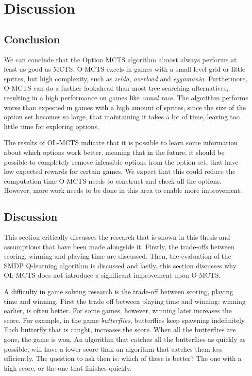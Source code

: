 \chapter{Discussion}
\label{sec:conclusion}



\section{Conclusion}
We can conclude that the Option MCTS algorithm almost always performs at least
as good as MCTS. O-MCTS excels in games with a small level grid or little
sprites, but high complexity, such as \textit{zelda}, \textit{overload} and
\textit{eggomania}.  Furthermore, O-MCTS can do a further lookahead than most
tree searching alternatives, resulting in a high performance on games like
\textit{camel race}. The algorithm performs worse than expected in games with a
high amount of sprites, since the size of the option set becomes so large, that
maintaining it takes a lot of time, leaving too little time for exploring
options. 

The results of OL-MCTS indicate that it is possible to learn some information
about which options work better, meaning that in the future, it should be
possible to completely remove infeasible options from the option set, that have
low expected rewards for certain games. We expect that this could reduce the
computation time O-MCTS needs to construct and check all the options. However,
more work needs to be done in this area to enable more improvement.

\section{Discussion}
This section critically discusses the research that is shown in this thesis and
assumptions that have been made alongside it. Firstly, the trade-offs between
scoring, winning and playing time are discussed. Then, the evaluation of the
SMDP Q-learning algorithm is discussed and lastly, this section discusses why
OL-MCTS does not introduce a significant improvement upon O-MCTS.

A difficulty in game solving research is the trade-off between scoring, playing
time and winning. First the trade off between playing time and winning: winning
earlier, is often better. For some games, however, winning later increases the
score. For example, in the game \textit{butterflies}, butterflies keep spawning
indefinitely. Each butterfly that is caught, increases the score.  When all the
butterflies are gone, the game is won. An algorithm that catches all the
butterflies as quickly as possible, will have a lower score than an algorithm
that catches them less efficiently. The question to ask then is: which of these
is better? The one with a high score, or the one that finishes quickly.

